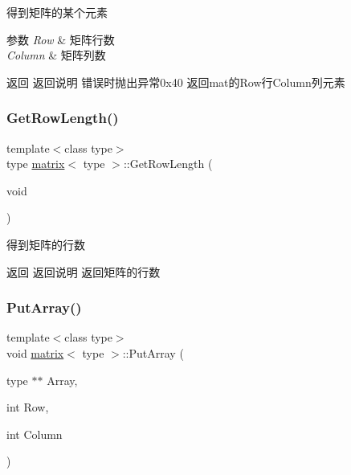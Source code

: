 得到矩阵的某个元素 


\begin{DoxyParams}{参数}
{\em Row} & 矩阵行数 \\
\hline
{\em Column} & 矩阵列数\\
\hline
\end{DoxyParams}
\begin{DoxyReturn}{返回}
返回说明 错误时抛出异常0x40 返回mat的\+Row行\+Column列元素 
\end{DoxyReturn}
\mbox{\label{classmatrix_a1db0593aa62235f24143913564382990}} 
\subsubsection{\texorpdfstring{Get\+Row\+Length()}{GetRowLength()}}
{\footnotesize\ttfamily template$<$class type$>$ \\
type \mbox{\hyperlink{classmatrix}{matrix}}$<$ type $>$\+::Get\+Row\+Length (\begin{DoxyParamCaption}\item[{void}]{ }\end{DoxyParamCaption})\hspace{0.3cm}{\ttfamily [inline]}}



得到矩阵的行数 

\begin{DoxyReturn}{返回}
返回说明 返回矩阵的行数 
\end{DoxyReturn}
\mbox{\label{classmatrix_a7f2bec444e35753d7225daf48e04e677}} 
\subsubsection{\texorpdfstring{Put\+Array()}{PutArray()}}
{\footnotesize\ttfamily template$<$class type$>$ \\
void \mbox{\hyperlink{classmatrix}{matrix}}$<$ type $>$\+::Put\+Array (\begin{DoxyParamCaption}\item[{type $\ast$$\ast$}]{Array,  }\item[{int}]{Row,  }\item[{int}]{Column }\end{DoxyParamCaption})\hspace{0.3cm}{\ttfamily [inline]}}



